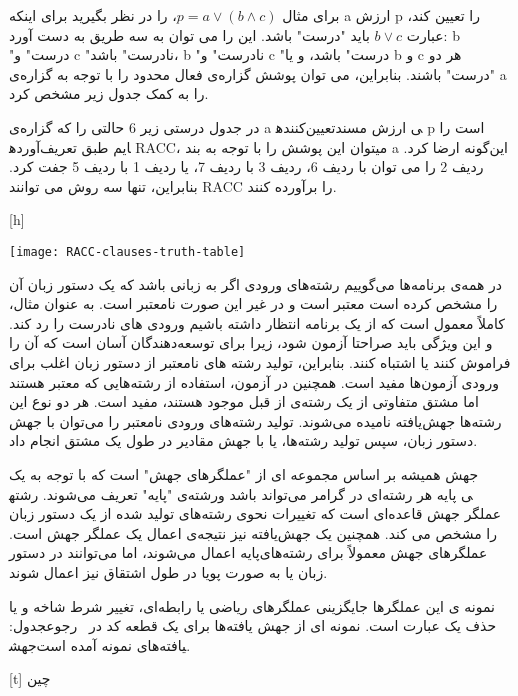 برای مثال
 $p = a \vee (b \wedge c)$،
 را در نظر بگیرید برای اینکه a ارزش p را تعیین کند، عبارت
$ b \vee c$
 باید "درست" باشد. این را می توان به سه طریق به دست آورد: b "درست" و c "نادرست" باشد، b "نادرست" و c "درست" باشد، و یا b و c هر دو "درست" باشند. بنابراین، می توان پوشش گزاره‌ی فعال محدود را با توجه به گزاره‌ی a را به کمک جدول زیر مشخص کرد. 
 
در جدول درستی زیر 6 حالتی را که گزاره‌ی a تعیین‌کننده‎ی ارزش مسند p است را آورده‎ایم طبق تعریف RACC، میتوان این پوشش را با توجه به بند a این‌گونه ارضا کرد. ردیف 2 را می توان با ردیف 6، ردیف 3 با ردیف 7، یا ردیف 1 با ردیف 5 جفت کرد. بنابراین، تنها سه روش می توانند RACC را برآورده کنند.

[h]
\raggedright
\texttt{[image: RACC-clauses-truth-table]}
\vspace{0.1em}


در همه‌ی برنامه‌ها می‌گوییم رشته‌های ورودی اگر به زبانی باشد که یک دستور زبان آن را مشخص کرده است معتبر است و در غیر این صورت نامعتبر است. به عنوان مثال، کاملاً معمول است که از یک برنامه انتظار داشته باشیم ورودی های نادرست را رد کند. و این ویژگی باید صراحتا آزمون شود، زیرا برای توسعه‌دهندگان آسان است که آن را فراموش کنند یا اشتباه کنند. بنابراین، تولید رشته های نامعتبر از دستور زبان اغلب برای ورودی آزمون‌ها مفید است. همچنین در آزمون، استفاده از رشته‌هایی که معتبر هستند اما مشتق متفاوتی از یک رشته‌ی از قبل موجود هستند، مفید است. هر دو نوع این رشته‌ها جهش‌یافته نامیده می‌شوند. تولید رشته‌های ورودی نامعتبر را می‌توان با جهش دستور زبان، سپس تولید رشته‌ها، یا با جهش مقادیر در طول یک مشتق انجام داد.

جهش همیشه بر اساس مجموعه ای از "عملگرهای جهش" است که با توجه به یک رشته‌ی "پایه" تعریف می‌شوند. رشته‎ی پایه هر رشته‌ای در گرامر می‌تواند باشد و عملگر جهش قاعده‌ای است که تغییرات نحوی رشته‌های تولید شده از یک دستور زبان را مشخص می کند. همچنین یک جهش‌یافته نیز نتیجه‌ی اعمال یک  عملگر جهش است. عملگرهای جهش معمولاً برای رشته‌های‌پایه اعمال می‌شوند، اما می‌توانند در دستور زبان یا به صورت پویا در طول اشتقاق نیز اعمال شوند.

نمونه ی این عملگرها جایگزینی عملگرهای ریاضی یا رابطه‌ای، تغییر شرط شاخه و یا حذف یک عبارت است. نمونه ای از جهش یافته‌ها برای یک قطعه کد در ~رجوع{جدول: جهش‎یافته‌های نمونه} آمده است.

[t]
‌چین



